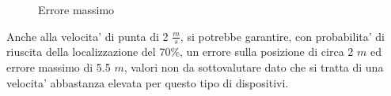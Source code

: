 \begin{figure}[H]
    \centering
    \hfill
    \caption{Errore massimo}
\end{figure}
Anche alla velocita' di punta di 2 $\frac{m}{s}$, si potrebbe garantire, con probabilita' di riuscita della localizzazione del 70\%, un errore sulla posizione di circa 2 $m$ ed errore massimo di 5.5 $m$, valori non da sottovalutare dato che si tratta di una velocita' abbastanza elevata per questo tipo di dispositivi. 


